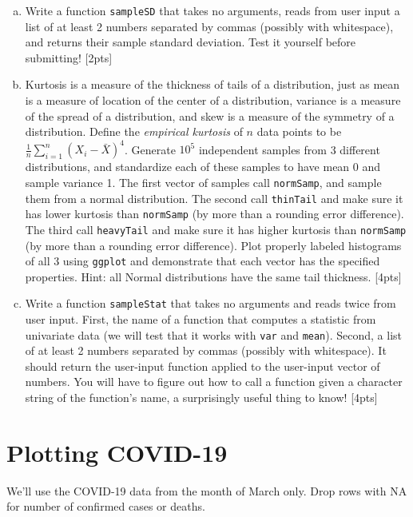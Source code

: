 \documentclass[12pt]{article}
\begin{document}
\begin{enumerate}[(a)]
	\item Write a function \verb|sampleSD| that takes no arguments, reads from user input a list of at least 2 numbers separated by commas (possibly with whitespace), and returns their sample standard deviation. Test it yourself before submitting! [2pts]
	\item Kurtosis is a measure of the thickness of tails of a distribution, just as mean is a measure of location of the center of a distribution, variance is a measure of the spread of a distribution, and skew is a measure of the symmetry of a distribution. Define the \textit{empirical kurtosis} of $n$ data points to be $\frac{1}{n} \sum_{i=1}^n (X_i - \bar{X})^4$. Generate $10^5$ independent samples from 3 different distributions, and standardize each of these samples to have mean 0 and sample variance 1. The first vector of samples call \verb|normSamp|, and sample them from a normal distribution. The second call \verb|thinTail| and make sure it has lower kurtosis than \verb|normSamp| (by more than a rounding error difference). The third call \verb|heavyTail| and make sure it has higher kurtosis than \verb|normSamp| (by more than a rounding error difference). Plot properly labeled histograms of all 3 using \verb|ggplot| and demonstrate that each vector has the specified properties. Hint: all Normal distributions have the same tail thickness. [4pts]
	\item Write a function \verb|sampleStat| that takes no arguments and reads twice from user input. First, the name of a function that computes a statistic from univariate data (we will test that it works with \verb|var| and \verb|mean|). Second, a list of at least 2 numbers separated by commas (possibly with whitespace). It should return the user-input function applied to the user-input vector of numbers. You will have to figure out how to call a function given a character string of the function's name, a surprisingly useful thing to know! [4pts]
\end{enumerate}

\section{Plotting COVID-19}

We'll use the COVID-19 data from the month of March only. Drop rows with NA for number of confirmed cases or deaths.
\end{document}

